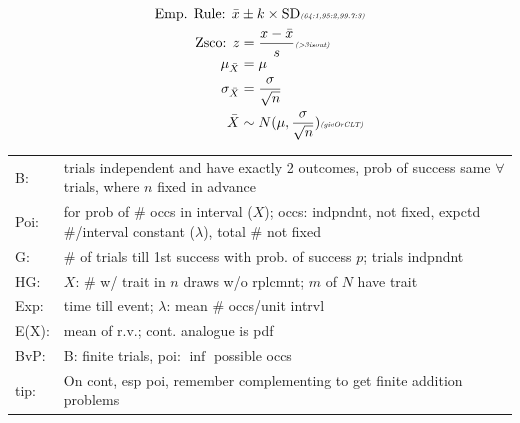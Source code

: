 \documentclass{article}
\makeatletter
\newcommand{\note}[1]{\tiny\smash{\textit{#1}}}
\newcommand{\multinote}[1]{%
  \begin{tabularx}{\linewidth}{@{}l >{\raggedright\arraybackslash}X@{}}
  #1
  \end{tabularx}%
}
\makeatother
\begin{document}
\begin{minipage}{0.48\textwidth}
    \begin{align*}
	    \text{Emp. Rule: } \bar x &\pm k \times \text{SD} \note{(64:1,95:2,99.7:3)} \\
	    \text{Zsco: } z &= \frac{x - \bar x}{s} \note{(>3isout)} \\
	    \mu_{\bar{X}} &= \mu \\
	    \sigma_{\bar{X}} &= \frac{\sigma}{\sqrt{n}} \\
	    \bar{X} &\sim N (\mu,\frac{\sigma}{\sqrt{n}}) \note{(givOrCLT)} \\
    \end{align*}
    \multinote{
	    B: & trials independent and have exactly 2 outcomes, prob of success same $\forall$ trials, where $n$ fixed in advance \\
	    Poi: & for prob of \# occs in interval ($X$); occs: indpndnt, not fixed, expctd \#/interval constant ($\lambda$), total \# not fixed \\
	    G: & \# of trials till 1st success with prob. of success $p$; trials indpndnt \\
	    HG: & $X$: \# w/ trait in $n$ draws w/o rplcmnt; $m$ of $N$ have trait \\
	    Exp: & time till event; $\lambda$: mean \# occs/unit intrvl \\
	    E(X): & mean of r.v.; cont. analogue is pdf \\
	    BvP: & B: finite trials, poi: $\inf$ possible occs \\
	    tip: & On cont, esp poi, remember complementing to get finite addition problems \\
    }
\end{minipage}
\newpage
\end{document}
